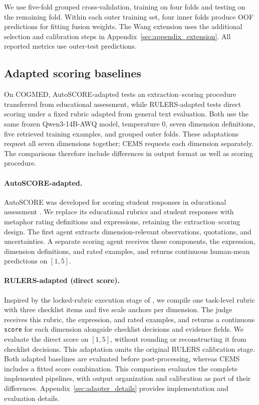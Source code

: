 We use five-fold grouped cross-validation, training on four folds and testing on the remaining fold. Within each outer training set, four inner folds produce OOF predictions for fitting fusion weights. The Wang extension uses the additional selection and calibration steps in Appendix~\ref{sec:appendix_extension}. All reported metrics use outer-test predictions.

\subsection{Adapted scoring baselines}
\label{sec:adaptations}

On COGMED, AutoSCORE-adapted tests an extraction--scoring procedure transferred from educational assessment, while RULERS-adapted tests direct scoring under a fixed rubric adapted from general text evaluation. Both use the same frozen Qwen3-14B-AWQ model, temperature 0, seven dimension definitions, five retrieved training examples, and grouped outer folds. These adaptations request all seven dimensions together; CEMS requests each dimension separately. The comparisons therefore include differences in output format as well as scoring procedure.

\paragraph{AutoSCORE-adapted.} AutoSCORE was developed for scoring student responses in educational assessment \citep{wang2026autoscore}. We replace its educational rubrics and student responses with metaphor rating definitions and expressions, retaining the extraction--scoring design. The first agent extracts dimension-relevant observations, quotations, and uncertainties. A separate scoring agent receives these components, the expression, dimension definitions, and rated examples, and returns continuous human-mean predictions on $[1,5]$.

\paragraph{RULERS-adapted (direct score).} Inspired by the locked-rubric execution stage of \citet{hong2026rulers}, we compile one task-level rubric with three checklist items and five scale anchors per dimension. The judge receives this rubric, the expression, and rated examples, and returns a continuous \texttt{score} for each dimension alongside checklist decisions and evidence fields. We evaluate the direct score on $[1,5]$, without rounding or reconstructing it from checklist decisions. This adaptation omits the original RULERS calibration stage. Both adapted baselines are evaluated before post-processing, whereas CEMS includes a fitted score combination. This comparison evaluates the complete implemented pipelines, with output organization and calibration as part of their differences.  Appendix~\ref{sec:adapter_details} provides implementation and evaluation details.

